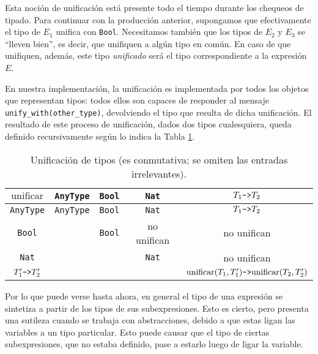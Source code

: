 \documentclass[11pt]{article}
\begin{document}
Esta noción de unificación está presente todo el tiempo durante los
chequeos de tipado. Para continuar con la producción anterior, supongamos
que efectivamente el tipo de $E_1$ unifica con \verb|Bool|. Necesitamos
también que los tipos de $E_2$ y $E_3$ se ``lleven bien'', es decir, que
unifiquen a algún tipo en común. En caso de que unifiquen, además, este
tipo \emph{unificado} será el tipo correspondiente a la expresión $E$.

En nuestra implementación, la unificación es implementada por
todos los objetos que representan tipos: todos ellos son capaces de
responder al mensaje \lstinline{unify_with(other_type)}, devolviendo el tipo
que resulta de dicha unificación.
El resultado de este proceso de unificación, dados dos tipos cualesquiera,
queda definido recursivamente según lo indica la Tabla \ref{table:unificacion}.

\begin{table} \centering
\begin{tabular}{c|c|c|c|c}
$\text{unificar}$   & \verb|AnyType| & \verb|Bool| & \verb|Nat|  & $T_1\verb|->|T_2$ \\ \hline
\verb|AnyType|      & \verb|AnyType| & \verb|Bool| & \verb|Nat|  & $T_1\verb|->|T_2$ \\
\verb|Bool|         &                & \verb|Bool| & no unifican & no unifican       \\
\verb|Nat|          &                &             & \verb|Nat|  & no unifican       \\
$T'_1\verb|->|T'_2$ &                &             &             &
	$\text{unificar}(T_1,T'_1)\verb|->|\text{unificar}(T_2,T'_2)$ \\
\end{tabular}
\caption{Unificación de tipos (es conmutativa; se omiten las entradas
	irrelevantes).}
\label{table:unificacion}
\end{table}

Por lo que puede verse hasta ahora, en general el tipo de una expresión
se sintetiza a partir de los tipos de sus subexpresiones. Esto es cierto, pero
presenta una sutileza cuando se trabaja con abstracciones, debido a que estas
ligan las variables a un tipo particular. Esto puede causar que el tipo de
ciertas subexpresiones, que no estaba definido, pase a estarlo luego de ligar
la variable.
\end{document}
